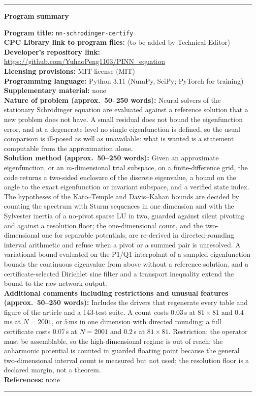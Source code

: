 \documentclass[preprint,12pt,number]{elsarticle}
\newenvironment{programsummary}
  {\par\medskip\noindent\rule{\linewidth}{0.5pt}\par\vspace{2pt}
   \noindent\textbf{Program summary}\par\nopagebreak\vspace{2pt}\footnotesize}
  {\par\nopagebreak[4]\vspace{2pt}\noindent\rule{\linewidth}{0.5pt}\par\medskip}
\begin{document}
\begin{programsummary}
\noindent\textbf{Program title:} \texttt{nn-schrodinger-certify}\\
\textbf{CPC Library link to program files:} (to be added by Technical Editor)\\
\textbf{Developer's repository link:}\\
\url{https://github.com/YuhaoPeng1103/PINN_equation}\\
\textbf{Licensing provisions:} MIT license (MIT)\\
\textbf{Programming language:} Python 3.11 (NumPy, SciPy; PyTorch for
training)\\
\textbf{Supplementary material:} none\\
\textbf{Nature of problem (approx.\ 50--250 words):} Neural solvers of the
stationary Schr\"odinger equation are evaluated against a reference solution
that a new problem does not have. A small residual does not bound the
eigenfunction error, and at a degenerate level no single eigenfunction is
defined, so the usual comparison is ill-posed as well as unavailable: what is
wanted is a statement computable from the approximation alone.\\
\textbf{Solution method (approx.\ 50--250 words):} Given an approximate eigenfunction, or an
$m$-dimensional trial subspace, on a finite-difference grid, the code returns a
two-sided enclosure of the discrete eigenvalue, a bound on the angle to the
exact eigenfunction or invariant subspace, and a verified state index. The
hypotheses of the Kato--Temple and Davis--Kahan bounds are decided by counting
the spectrum with Sturm sequences in one dimension and with the Sylvester
inertia of a no-pivot sparse LU in two, guarded against silent pivoting and
against a resolution floor; the
one-dimensional count, and the two-dimensional one for separable potentials,
are re-derived in directed-rounding interval arithmetic and refuse when a
pivot or a summed pair is unresolved. A variational bound evaluated on the
P1/Q1 interpolant of a sampled eigenfunction bounds the continuous eigenvalue
from above without a reference solution, and a certificate-selected Dirichlet
sine filter and a transport inequality extend the bound to the raw network
output.\\
\textbf{Additional comments including restrictions and unusual features
(approx.\ 50--250 words):} Includes the drivers that regenerate every table
and figure of the article and a 143-test suite. A count costs $0.03$\,s at
$81\times81$ and $0.4$\,ms at $N=2001$, or $5$\,ms in one dimension with
directed rounding; a full certificate costs $0.07$\,s at $N=2001$ and
$0.2$\,s at $81\times81$. Restriction: the operator must be assemblable, so
the high-dimensional regime is out of reach; the anharmonic potential is
counted in guarded floating point because the general two-dimensional
interval count is measured but not used; the resolution floor is a declared
margin, not a theorem.\\
\textbf{References:} none
\end{programsummary}
\end{document}
